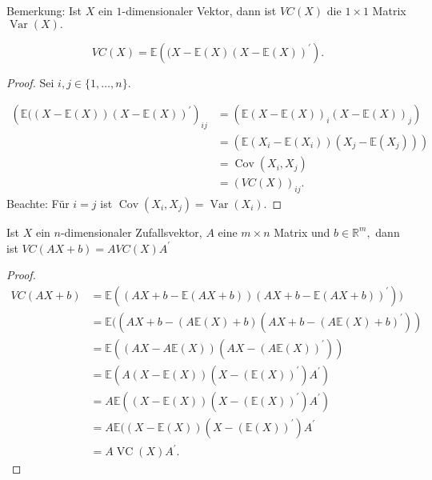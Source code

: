 \documentclass{tstextbook}
\DeclareMathOperator{\Cov}{Cov}
\DeclareMathOperator{\VC}{VC}
\DeclareMathOperator{\Var}{Var}
\begin{document}
\begin{remark}
	Bemerkung: Ist $X$ ein $1$-dimensionaler Vektor, dann ist $VC(X)$ die $1\times1$ Matrix $\Var(X).$
\end{remark}

\begin{theorem}
    \[ VC(X)=\mathbb{E}\left((X-\mathbb{E}(X)(X-\mathbb{E}(X))^\prime \right).\]
\end{theorem}

\begin{proof}
    Sei $i,j\in\lbrace1,\ldots,n\rbrace.$

\begin{equation*}
\begin{split}
\left(\mathbb{E}((X-\mathbb{E}(X))(X-\mathbb{E}(X))^\prime\right)_{ij} & = \left(\mathbb{E}(X-\mathbb{E}(X))_i(X-\mathbb{E}(X))_j\right) \\
 & = \left(\mathbb{E}(X_i-\mathbb{E}(X_i))(X_j-\mathbb{E}(X_j))\right) \\
 &= \Cov(X_i,X_j) \\
 &= (VC(X))_{ij}. 
\end{split}
\end{equation*}
Beachte: Für $i=j$ ist $\Cov(X_i,X_j)=\Var(X_i). $
    
\end{proof}

\begin{theorem}
    Ist $X$ ein $n$-dimensionaler Zufallsvektor, $A$ eine $m\times n$ Matrix und $b\in\mathbb{R}^m,$ dann ist $VC(AX+b)=AVC(X)A^\prime$
\end{theorem}
   
        
\begin{proof}
\begin{align*}
    	VC(AX+b) & = \mathbb{E}((AX+b-\mathbb{E}(AX+b))(AX+b-\mathbb{E}(AX+b))^\prime)) \\
    	& = \mathbb{E}((AX+b-(A\mathbb{E}(X)+b)(AX+b-(A\mathbb{E}(X)+b)^\prime)) \\
    	& = \mathbb{E}((AX-A\mathbb{E}(X))(AX-(A\mathbb{E}(X))^\prime)) \\
    	& = \mathbb{E}(A(X-\mathbb{E}(X))(X-(\mathbb{E}(X))^\prime)A^\prime) \\
    	& = A\mathbb{E}((X-\mathbb{E}(X))(X-(\mathbb{E}(X))^\prime)A^\prime) \\
    	& = A\mathbb{E}((X-\mathbb{E}(X))(X-(\mathbb{E}(X))^\prime)A^\prime \\
    	& = A\VC(X)A^\prime.
\end{align*} 
\end{proof}
\end{document}
